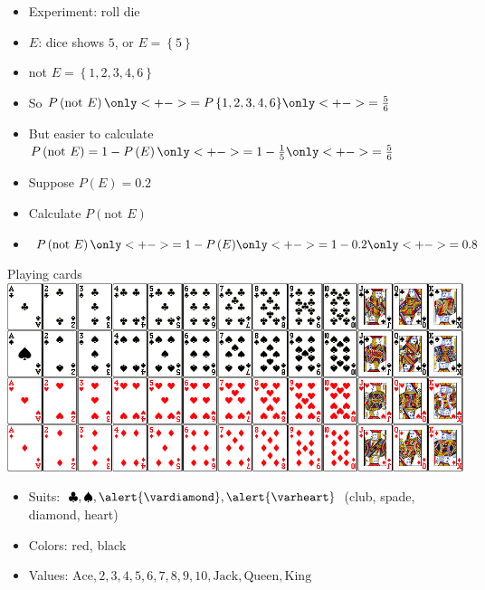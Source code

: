 \documentclass[handout]{beamer}
\theoremstyle{definition}
\begin{document}
\begin{frame}
\begin{example}
\begin{itemize}
\item Experiment: roll die
\item $E$: dice shows $5$, or $E=\left\{5\right\}$
\item not $E=\left\{1,2,3,4,6\right\}$
\item So $P\left(\text{not $E$}\right)
\only<+->{=P\left\{1,2,3,4,6\right\}}
\only<+->{=\frac{5}{6}}$
\item But easier to calculate 
$P\left(\text{not $E$}\right)=1-P\left(E\right)
\only<+->{=1-\frac{1}{5}}
\only<+->{=\frac{5}{6}}$
\end{itemize}
\end{example}
\begin{example}
\begin{itemize}
\item Suppose $P\left(E\right)=0.2$
\item Calculate $P\left(\text{not $E$}\right)$
\item $P\left(\text{not $E$}\right)
\only<+->{=1-P\left(E\right)}
\only<+->{=1-0.2}\only<+->{=0.8}$
\end{itemize}
\end{example}
\end{frame}

\begin{frame}{Playing cards}
\includegraphics[scale=.34]{cards}
\begin{itemize}
\item Suits: $\clubsuit,\spadesuit,\alert{\vardiamond},\alert{\varheart}$
(club, spade, diamond, heart)
\item Colors: \alert{red}, black
\item Values: $\text{Ace},2,3,4,5,6,7,8,9,10,\text{Jack},\text{Queen},\text{King}$
\end{itemize}
\end{frame}
\end{document}
